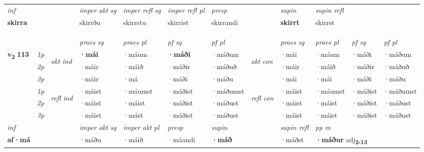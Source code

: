 \begin{longtable}[l]{X>{\footnotesize\itshape}llXXXXlXXXX}
   {\textit{inf}} & &  & \textit{imper akt sg}  & \textit{imper refl sg} & \textit{imper refl pl} & \textit{presp} && \textit{supin} & \textit{supin refl}  \\*
  {\textbf{skirra}} & && skirrðu   & skirrstu & skirrist & skirrandi &&  \textbf{skirrt} & skirrst  \\*

\midrule
 & \\*
   & \\*
  & \\
   \midrule
 & &   & \textit{praes sg}  & \textit{praes pl}    & \textit{ pf sg} & \textit{pf pl} & & \textit{praes sg}  & \textit{praes pl}    & \textit{pf sg} & \textit{pf pl }  \\ \cmidrule{4-7} \cmidrule{9-12}
 \multirow{2}{*}{{{\textbf{v{\textsubscript{2}}} \Large{\textbf{113}}}}}  & 1p & \multirow{3}{*}{\begin{turn}{90}\textit{akt ind}\end{turn}} & \textbf{·mái} & ·máum & \textbf{·máði} & ·máðum & \multirow{3}{*}{\begin{turn}{90}\textit{akt con}\end{turn}} &·mái & ·máum & ·máði & ·máðum\\*
 & 2p &  &  ·máir  & ·máið & ·máðir & ·máðuð & & ·máir & ·máið & ·máðir & ·máðuð \\*
 & 3p &  & ·máir & ·má & ·máði & ·máðu & & ·mái & ·mái& ·máði & ·máðu \\*
\cmidrule{4-7} \cmidrule{9-12}
 & 1p & \multirow{3}{*}{\begin{turn}{90}\textit{refl ind}\end{turn}}  & ·máist & ·máumst & ·máðist & ·máðumst & \multirow{3}{*}{\begin{turn}{90}\textit{refl con}\end{turn}}  &·máist & ·máumst & ·máðist & ·máðumst \\*
 & 2p &  & ·máist & ·máist & ·máðist & ·máðust & &·máist & ·máist & ·máðist & ·máðust \\*
 & 3p  & & ·máist & ·mást & ·máðist & ·máðust & & ·máist & ·máist& ·máðist & ·máðust \\*
\cmidrule{4-7} \cmidrule{9-12}

   {\textit{inf}} & &  & \textit{imper akt sg} & \textit{imper akt pl}   & \textit{presp} & \textit{supin} && \textit{supin refl} & \textit{pp m} \\*
  {\textbf{af\allowbreak ·má}} & && ·máðu  & ·máið   & ·máandi &  \textbf{·máð} && ·máðst & \multicolumn{2}{l}{\textbf{·máður} adj\textbf{\textsubscript{2-13}}} \\*


\end{longtable}
